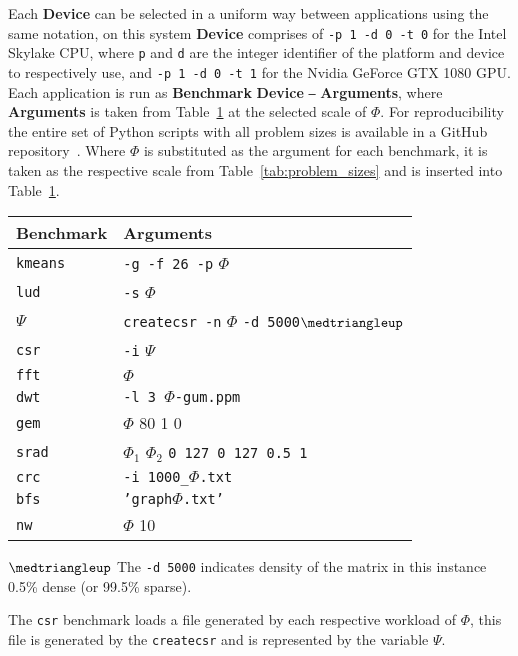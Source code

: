 \documentclass[../document.tex]{subfiles}
\begin{document}
Each {\bf Device} can be selected in a uniform way between applications using the same notation, on this system {\bf Device} comprises of {\tt -p 1 -d 0 -t 0} for the Intel Skylake CPU, where {\tt p} and {\tt d} are the integer identifier of the platform and device to respectively use, and {\tt -p 1 -d 0 -t 1} for the Nvidia GeForce GTX 1080 GPU.
Each application is run as {\bf Benchmark} {\bf Device} {\tt --} {\bf Arguments}, where {\bf Arguments} is taken from Table~\ref{tab:program_arguments} at the selected scale of $\Phi$.
For reproducibility the entire set of Python scripts with all problem sizes is available in a GitHub repository~\cite{johnston2017}. 
Where $\Phi$ is substituted as the argument for each benchmark, it is taken as the respective scale from Table~\ref{tab:problem_sizes} and is inserted into Table~\ref{tab:program_arguments}.

\begin{table}[t]
	\centering
	\begin{threeparttable}
		\centering
		\vspace{0pt}
		\begin{tabular}{l|l}
			\bf Benchmark & \bf Arguments\\\hline
			{\tt kmeans} & {\tt -g -f 26 -p} $\Phi$\\
			{\tt lud} & {\tt -s} $\Phi$\\
			$\Psi$ & {\tt createcsr -n} $\Phi$ {\tt -d 5000}$\medtriangleup$\\
			{\tt csr}\textdagger & {\tt -i} $\Psi$\\
			{\tt fft} & $\Phi$ \\
			{\tt dwt} & {\tt -l 3 }$\Phi${\tt-gum.ppm}\\
			{\tt gem} & $\Phi$ {80 1 0}\\
			{\tt srad}& $\Phi_1$ $\Phi_2$ {\tt 0 127 0 127 0.5 1}\\
			{\tt crc}&  {\tt -i 1000\_}$\Phi${\tt.txt}\\
            {\tt bfs}&  {\tt 'graph}$\Phi${\tt.txt'}\\
            {\tt nw}&  $\Phi${ 10}\\
		\end{tabular}
		\begin{tablenotes}
			\item [$\medtriangleup$] The {\tt -d 5000} indicates density of the matrix in this instance 0.5\% dense (or 99.5\% sparse).
			\item [\textdagger] The {\tt csr} benchmark loads a file generated by each respective workload of $\Phi$, this file is generated by the {\tt createcsr} and is represented by the variable $\Psi$.
		\end{tablenotes}
		\label{tab:program_arguments}
	\end{threeparttable}
\end{table}
\end{document}
